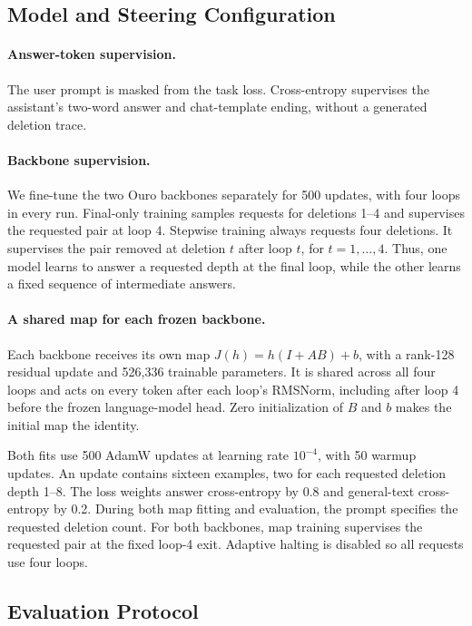 \documentclass{article}
\begin{document}
\subsection{Model and Steering Configuration}

\paragraph{Answer-token supervision.}
The user prompt is masked from the task loss. Cross-entropy supervises the assistant's two-word answer and chat-template ending, without a generated deletion trace.

\paragraph{Backbone supervision.}
We fine-tune the two Ouro backbones separately for 500 updates, with four loops in every run. Final-only training samples requests for deletions 1--4 and supervises the requested pair at loop 4. Stepwise training always requests four deletions. It supervises the pair removed at deletion $t$ after loop $t$, for $t=1,\ldots,4$. Thus, one model learns to answer a requested depth at the final loop, while the other learns a fixed sequence of intermediate answers.

\paragraph{A shared map for each frozen backbone.}
Each backbone receives its own map $J(h)=h(I+AB)+b$, with a rank-128 residual update and 526,336 trainable parameters. It is shared across all four loops and acts on every token after each loop's RMSNorm, including after loop 4 before the frozen language-model head. Zero initialization of $B$ and $b$ makes the initial map the identity.

Both fits use 500 AdamW updates at learning rate $10^{-4}$, with 50 warmup updates. An update contains sixteen examples, two for each requested deletion depth 1--8. The loss weights answer cross-entropy by 0.8 and general-text cross-entropy by 0.2. During both map fitting and evaluation, the prompt specifies the requested deletion count. For both backbones, map training supervises the requested pair at the fixed loop-4 exit. Adaptive halting is disabled so all requests use four loops.

\subsection{Evaluation Protocol}
\end{document}
